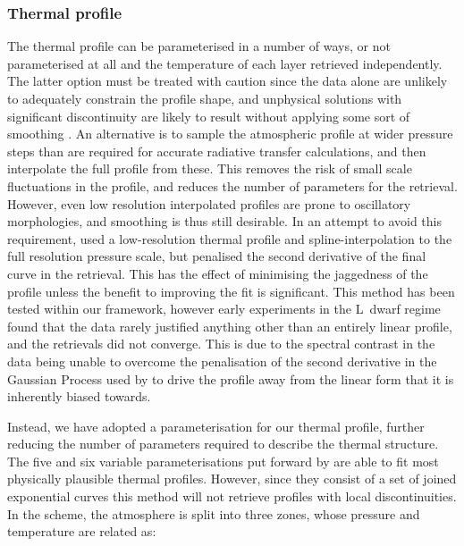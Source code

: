 \documentclass[useAMS,usenatbib]{mn2e}
\begin{document}
\subsubsection{Thermal profile}

The thermal profile can be parameterised in a number of ways, or not parameterised at all and the temperature of each layer retrieved independently. The latter option must be treated with caution since the data alone are unlikely to adequately constrain the profile shape, and unphysical solutions with significant discontinuity are likely to result without applying some sort of smoothing \citep[e.g.][]{irwin2008, line2014}. 
An alternative is to sample the atmospheric profile at wider pressure steps than are required for accurate radiative transfer calculations, and then interpolate the full profile from these. This removes the risk of small scale fluctuations in the profile, and reduces the number of parameters for the retrieval. However, even low resolution interpolated profiles are prone to oscillatory morphologies, and smoothing is thus still desirable. In an attempt to avoid this requirement, \citet{line2015} used a low-resolution thermal profile and spline-interpolation to the full resolution pressure scale, but penalised the second derivative of the final curve in the retrieval. This has the effect of minimising the jaggedness of the profile unless the benefit to improving the fit is significant. This method has been tested within our framework, however early experiments in the L~dwarf regime found that the data rarely justified anything other than an entirely linear profile, and the retrievals did not converge. This is due to the spectral contrast in the data being unable to overcome the penalisation of the second derivative in the Gaussian Process used by \citet{line2015} to drive the profile away from the linear form that it is inherently biased towards.


Instead, we have adopted a parameterisation for our thermal profile, further reducing the number of parameters required to describe the thermal structure. The five and six variable parameterisations put forward by \citet{madhu2009} are able to fit most physically plausible thermal profiles. However, since they consist of a set of joined exponential curves this method will not retrieve profiles with local discontinuities. In the \citet{madhu2009} scheme, the atmosphere is split into three zones, whose pressure and temperature are related as:
\end{document}
